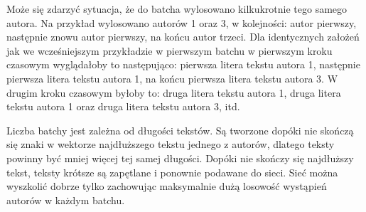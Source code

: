 Może się zdarzyć sytuacja, że do batcha wylosowano kilkukrotnie tego samego autora. Na przykład wylosowano
autorów 1 oraz 3, w kolejności: autor pierwszy, następnie znowu autor pierwszy, na końcu autor trzeci.
Dla identycznych założeń jak we wcześniejszym przykładzie w pierwszym batchu w pierwszym kroku czasowym wyglądałoby to
 następująco: pierwsza litera tekstu autora 1, następnie pierwsza litera tekstu autora 1,
na końcu pierwsza litera tekstu autora 3. W drugim kroku czasowym byłoby to:
druga litera tekstu autora 1, druga litera tekstu autora 1 oraz druga litera tekstu autora 3, itd.

Liczba batchy jest zależna od długości tekstów. Są tworzone dopóki nie skończą się znaki w wektorze
najdłuższego tekstu jednego z autorów, dlatego teksty powinny być mniej więcej tej samej długości. Dopóki nie skończy się 
najdłuższy tekst, teksty krótsze są zapętlane i ponownie podawane do sieci.  Sieć można
wyszkolić dobrze tylko zachowując maksymalnie dużą losowość wystąpień autorów w każdym batchu.
